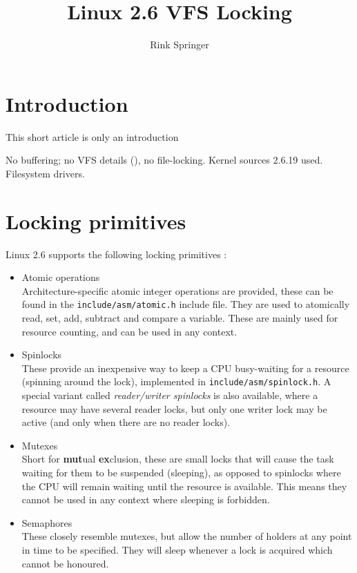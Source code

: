 \documentclass[a4paper,11pt]{article}
\begin{document}
\title{Linux 2.6 VFS Locking}
\author{Rink Springer}
\maketitle

\section{Introduction}

This short article is only an introduction

No buffering; no VFS details (\cite{springer05techreport}), no file-locking. Kernel sources 2.6.19 used. Filesystem drivers.

\section{Locking primitives}

Linux 2.6 supports the following locking primitives \cite{love05kerneldev, russell03guidelock}:

\begin{itemize}
\item Atomic operations \\
Architecture-specific atomic integer operations are provided, these can be found in the \texttt{include/asm/atomic.h} include file. They are used to atomically read, set, add, subtract and compare a variable. These are mainly used for resource counting, and can be used in any context.
\item Spinlocks \\
These provide an inexpensive way to keep a CPU busy-waiting for a resource (spinning around the lock), implemented in \texttt{include/asm/spinlock.h}. A special variant called \emph{reader/writer spinlocks} is also available, where a resource may have several reader locks, but only one writer lock may be active (and only when there are no reader locks).
\item Mutexes \\
Short for \textbf{mut}ual \textbf{ex}clusion, these are small locks that will cause the task waiting for them to be suspended (sleeping), as opposed to spinlocks where the CPU will remain waiting until the resource is available. This means they cannot be used in any context where sleeping is forbidden.
\item Semaphores \\
These closely resemble mutexes, but allow the number of holders at any point in time to be specified. They will sleep whenever a lock is acquired which cannot be honoured.
\end{itemize}
\end{document}
